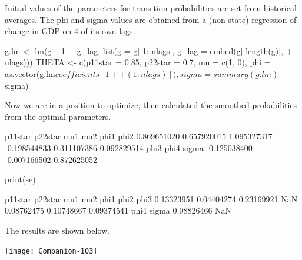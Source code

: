 \documentclass[a4paper]{article}
\begin{document}
Initial values of the parameters for transition probabilities are set from historical averages.
The phi and sigma values are obtained from a (non-state) regression of change in GDP on 4 of its own lags.
\begin{Schunk}
\begin{Sinput}
 g.lm <- lm(g ~ 1 + g_lag, list(g = g[-1:-nlags], g_lag = embed(g[-length(g)], 
+     nlags)))
 THETA <- c(p11star = 0.85, p22star = 0.7, mu = c(1, 0), phi = as.vector(g.lm$coefficients[1 + 
+     (1:nlags)]), sigma = summary(g.lm)$sigma)
\end{Sinput}
\end{Schunk}
Now we are in a position to optimize, then calculated the smoothed probabilities from the
optimal parameters. 
\begin{Schunk}
\begin{Soutput}
     p11star      p22star          mu1          mu2         phi1         phi2 
 0.869651020  0.657920015  1.095327317 -0.198544833  0.311107386  0.092829514 
        phi3         phi4        sigma 
-0.125038400 -0.007166502  0.872625052 
\end{Soutput}
\begin{Sinput}
 print(se)
\end{Sinput}
\begin{Soutput}
   p11star    p22star        mu1        mu2       phi1       phi2       phi3 
0.13323951 0.04404274 0.23169921        NaN 0.08762475 0.10748667 0.09374541 
      phi4      sigma 
0.08826466        NaN 
\end{Soutput}
\end{Schunk}
The results are shown below.
\begin{center}
\texttt{[image: Companion-103]}
\end{center}
\end{document}
